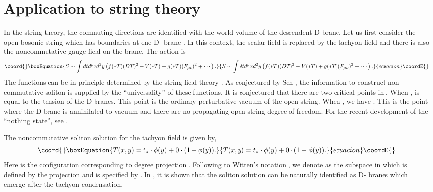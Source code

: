 \documentclass[a4paper,12pt]{article}
\begin{document}
\section{Application to string theory}
In the string theory, the commuting
directions are identified with the world volume
of the descendent D-brane.
Let us first consider the open bosonic string 
which has boundaries at one D-\coordHE{} brane \cite{r:Chicago}.
In this context, the scalar field is replaced by
the tachyon field \coordHE{} and there is also 
the noncommutative \coordHE{} gauge field
\coordHE{} on the brane. The action is
\begin{equation}\coord{}\boxEquation{
 S\sim \int dt d^{p} x d^2 y\left(
f(* T) (D T)^2 -V(* T) + g(* T)(F_{\mu\nu})^2
+\cdots\right).
}{
 S\sim \int dt d^{p} x d^2 y\left(
f(* T) (D T)^2 -V(* T) + g(* T)(F_{\mu\nu})^2
+\cdots\right).
}{ecuacion}\coordE{}\end{equation}
%
%
The functions \coordHE{} can be in principle
determined by the string field theory \cite{r:SFT}.
As conjectured by Sen \cite{r:Sen}, the information
to construct non-commutative soliton is supplied by the
``universality'' of these functions.  It is conjectured
that there are two critical points \coordHE{} in \coordHE{}.
When \coordHE{}, \coordHE{} is equal to the tension of the
D-branes.  This point is the ordinary perturbative
vacuum of the open string.
When \coordHE{}, we have \coordHE{}.
This is the point where the D-brane is annihilated to vacuum 
and there are no propagating open string degree of freedom.
For the recent development of the ``nothing state'', see \cite{r:nothing}.

The noncommutative soliton solution for the tachyon field 
is given by,
\begin{equation}\coord{}\boxEquation{
 T(x,y) = t_* \cdot \phi(y) + 0\cdot (1-\phi(y)).
}{
 T(x,y) = t_* \cdot \phi(y) + 0\cdot (1-\phi(y)).
}{ecuacion}\coordE{}\end{equation}
Here \coordHE{} is the configuration corresponding to
degree \coordHE{} projection \coordHE{}.  
Following to Witten's notation \cite{r:Witten},
we denote \coordHE{} as the subspace in \myHighlight{$\cH$}\coordHE{} which is defined by the
projection \coordHE{} and \coordHE{} is specified by \coordHE{}.  
In \cite{r:Chicago}, it is shown that
the soliton solution can be naturally identified as \coordHE{}
D-\coordHE{} branes which emerge after the tachyon condensation.
\end{document}
